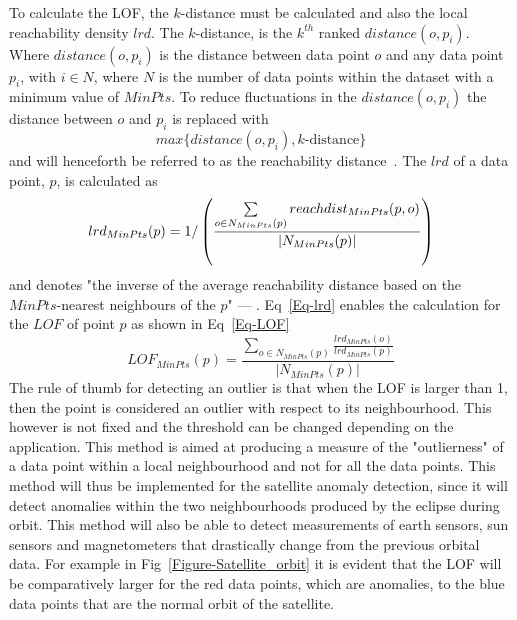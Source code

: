 To calculate the LOF, the $k$-distance must be calculated and also the local reachability density \(lrd\). The $k$-distance, is the $k^{th}$ ranked $distance(o,p_i)$. Where $distance(o,p_i)$ is the distance between data point $o$ and any data point $p_i$, with $i \in N$, where $N$ is the number of data points within the dataset with a minimum value of $MinPts$. To reduce fluctuations in the $distance(o,p_i)$ the distance between $o$ and $p_i$ is replaced with 
\begin{equation}
max \{distance(o,p_i), k\text{-distance}\} 
\end{equation}
and will henceforth be referred to as the reachability distance~\cite{breunig2000lof}. The $lrd$ of a data point, $p$, is calculated as 
\begin{equation}
lrd_{MinPts}(p) = 1/\left(\frac{\sum\limits_{o \in N_{MinPts}(p)}^{} reach\-dist_{MinPts}(p,o)}{|N_{MinPts}(p)|}\right)
\label{Eq-lrd}
\end{equation}
and denotes "the inverse of the average reachability distance based on the $MinPts$-nearest neighbours of the $p$" --- \textcite{breunig2000lof}. Eq~\ref{Eq-lrd} enables the calculation for the $LOF$ of point $p$ as shown in Eq~\ref{Eq-LOF}
\begin{equation}
LOF_{MinPts}(p) = \frac{\sum\limits_{o \in N_{MinPts}(p)}^{}\frac{lrd_{MinPts}(o)}{lrd_{MinPts}(p)}}{|N_{MinPts}(p)|}
\label{Eq-LOF}
\end{equation}
The rule of thumb for detecting an outlier is that when the LOF is larger than 1, then the point is considered an outlier with respect to its neighbourhood. This however is not fixed and the threshold can be changed depending on the application.
This method is aimed at producing a measure of the "outlierness" of a data point within a local neighbourhood and not for all the data points. This method will thus be implemented for the satellite anomaly detection, since it will detect anomalies within the two neighbourhoods produced by the eclipse during orbit. This method will also be able to detect measurements of earth sensors, sun sensors and magnetometers that drastically change from the previous orbital data. For example in Fig~\ref{Figure-Satellite_orbit} it is evident that the LOF will be comparatively larger for the red data points, which are anomalies, to the blue data points that are the normal orbit of the satellite.

\begin{figure}[h!tb]
\centering
{}
\end{figure}

